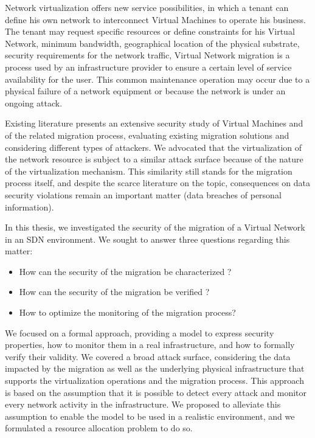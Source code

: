
\label{sec:thesis_conclusion}
Network virtualization offers new service possibilities, in which a tenant can define his own network to interconnect Virtual Machines to operate his business. The tenant may request specific resources or define constraints for his Virtual Network, \eg minimum bandwidth, geographical location of the physical substrate, security requirements for the network traffic, \etc
Virtual Network migration is a process used by an infrastructure provider to ensure a certain level of service availability for the user.
This common maintenance operation may occur due to a physical failure of a network equipment or because the network is under an ongoing attack.

Existing literature presents an extensive security study of Virtual Machines and of the related migration process, evaluating existing migration solutions and considering different types of attackers. We advocated that the virtualization of the network resource is subject to a similar attack surface because of the nature of the virtualization mechanism. This similarity still stands for the migration process itself, and despite the scarce literature on the topic, consequences on data security violations remain an important matter (\eg data breaches of personal information).

In this thesis, we investigated the security of the migration of a Virtual Network in an SDN environment. 
We sought to answer three questions regarding this matter:

\begin{itemize}
    \item How can the security of the migration be characterized ?
    \item How can the security of the migration be verified ?
    \item How to optimize the monitoring of the migration process? 
\end{itemize}

We focused on a formal approach, providing a model to express security properties, how to monitor them in a real infrastructure, and how to formally verify their validity. 
We covered a broad attack surface, considering the data impacted by the migration as well as the underlying physical infrastructure that supports the virtualization operations and the migration process. 
This approach is based on the assumption that it is possible to detect every attack and monitor every network activity in the infrastructure. 
We proposed to alleviate this assumption to enable the model to be used in a realistic environment, and we formulated a resource allocation problem to do so.


